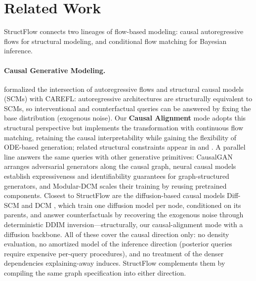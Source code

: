\section{Related Work}

StructFlow connects two lineages of flow-based modeling: causal autoregressive flows for structural modeling, and conditional flow matching for Bayesian inference.

\paragraph{Causal Generative Modeling.}
\citet{khemakhem2021causal} formalized the intersection of autoregressive flows and structural causal models (SCMs) with CAREFL: autoregressive architectures are structurally equivalent to SCMs, so interventional and counterfactual queries can be answered by fixing the base distribution (exogenous noise). Our \textbf{Causal Alignment} mode adopts this structural perspective but implements the transformation with continuous flow matching, retaining the causal interpretability while gaining the flexibility of ODE-based generation; related structural constraints appear in \citet{wehenkel2021graphical} and \citet{pawlowski2020deep}. A parallel line answers the same queries with other generative primitives: CausalGAN \citep{kocaoglu2018causalgan} arranges adversarial generators along the causal graph, neural causal models \citep{xia2021causal} establish expressiveness and identifiability guarantees for graph-structured generators, and Modular-DCM \citep{rahman2024modular} scales their training by reusing pretrained components. Closest to StructFlow are the diffusion-based causal models Diff-SCM \citep{sanchez2022diffusion} and DCM \citep{chao2023interventional}, which train one diffusion model per node, conditioned on its parents, and answer counterfactuals by recovering the exogenous noise through deterministic DDIM inversion---structurally, our causal-alignment mode with a diffusion backbone. All of these cover the causal direction only: no density evaluation, no amortized model of the inference direction (posterior queries require expensive per-query procedures), and no treatment of the denser dependencies explaining-away induces. StructFlow complements them by compiling the same graph specification into either direction.

